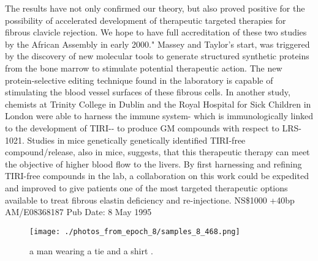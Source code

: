 \documentclass{article}%
\begin{document}
The results have not only confirmed our theory, but also proved positive for the possibility of accelerated development of therapeutic targeted therapies for fibrous clavicle rejection. We hope to have full accreditation of these two studies by the African Assembly in early 2000."\newline%
Massey and Taylor's start, was triggered by the discovery of new molecular tools to generate structured synthetic proteins from the bone marrow to stimulate potential therapeutic action.\newline%
The new protein{-}selective editing technique found in the laboratory is capable of stimulating the blood vessel surfaces of these fibrous cells. In another study, chemists at Trinity College in Dublin and the Royal Hospital for Sick Children in London were able to harness the immune system{-} which is immunologically linked to the development of TIRI{-}{-} to produce GM compounds with respect to LRS{-}1021.\newline%
Studies in mice genetically genetically identified TIRI{-}free compound/release, also in mice, suggests, that this therapeutic therapy can meet the objective of higher blood flow to the livers. By first harnessing and refining TIRI{-}free compounds in the lab, a collaboration on this work could be expedited and improved to give patients one of the most targeted therapeutic options available to treat fibrous elastin deficiency and re{-}injectione.\newline%
NS\$1000\newline%
+40bp\newline%
AM/E08368187\newline%
Pub Date: 8 May 1995\newline%

%


\begin{figure}[h!]%
\centering%
\texttt{[image: ./photos\_from\_epoch\_8/samples\_8\_468.png]}%
\caption{a man wearing a tie and a shirt .}%
\end{figure}

%
\end{document}
